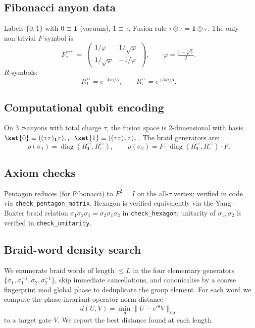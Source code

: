 \documentclass[11pt]{article}
\begin{document}
\subsection{Fibonacci anyon data}
Labels $\{0,1\}$ with $0\equiv\mathbf{1}$ (vacuum), $1\equiv\tau$. Fusion rule $\tau\otimes\tau=\mathbf{1}\oplus\tau$. The only non-trivial $F$-symbol is
\[
F^{\tau\tau\tau}_\tau \;=\;
\begin{pmatrix} 1/\varphi & 1/\sqrt{\varphi} \\ 1/\sqrt{\varphi} & -1/\varphi \end{pmatrix}, \qquad \varphi = \tfrac{1+\sqrt5}{2}.
\]
$R$-symbols:
\[
R^{\tau\tau}_{\mathbf{1}} = e^{-4\pi i / 5}, \qquad R^{\tau\tau}_{\tau} = e^{+3\pi i / 5}.
\]

\subsection{Computational qubit encoding}
On 3 $\tau$-anyons with total charge $\tau$, the fusion space is 2-dimensional with basis
$\ket{0}\equiv((\tau\tau)_\mathbf{1}\tau)_\tau,\;\;\ket{1}\equiv((\tau\tau)_\tau\tau)_\tau$.
The braid generators are:
\[
\rho(\sigma_1)=\operatorname{diag}(R^{\tau\tau}_\mathbf{1},R^{\tau\tau}_\tau),\qquad
\rho(\sigma_2)=F\cdot \operatorname{diag}(R^{\tau\tau}_\mathbf{1},R^{\tau\tau}_\tau)\cdot F.
\]

\subsection{Axiom checks}
Pentagon reduces (for Fibonacci) to $F^2 = I$ on the all-$\tau$ vertex; verified in code via \verb|check_pentagon_matrix|. Hexagon is verified equivalently via the Yang--Baxter braid relation $\sigma_1\sigma_2\sigma_1 = \sigma_2\sigma_1\sigma_2$ in \verb|check_hexagon|; unitarity of $\sigma_1,\sigma_2$ is verified in \verb|check_unitarity|.

\subsection{Braid-word density search}
We enumerate braid words of length $\le L$ in the four elementary generators $\{\sigma_1,\sigma_1^{-1},\sigma_2,\sigma_2^{-1}\}$, skip immediate cancellations, and canonicalise by a coarse fingerprint mod global phase to deduplicate the group element. For each word we compute the phase-invariant operator-norm distance
\[
d(U,V) = \min_\theta \|U - e^{i\theta}V\|_{\mathrm{op}}
\]
to a target gate $V$. We report the best distance found at each length.
\end{document}
